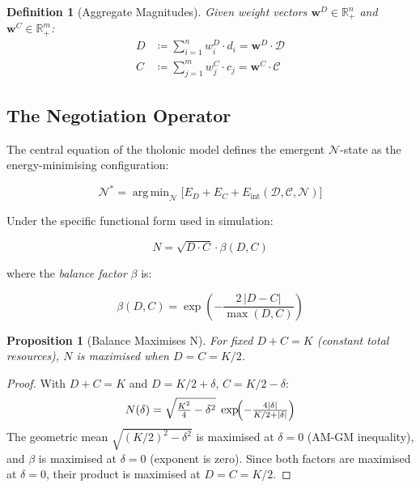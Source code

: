 \documentclass[12pt,a4paper,twocolumn]{article}
\newtheorem{proposition}[theorem]{Proposition}
\newtheorem{definition}{Definition}[section]
\newcommand{\N}{\mathcal{N}}
\newcommand{\D}{\mathcal{D}}
\newcommand{\CC}{\mathcal{C}}
\newcommand{\R}{\mathbb{R}}
\newcommand{\argmin}{\operatorname{arg\,min}}
\begin{document}
\begin{definition}[Aggregate Magnitudes]
\label{def:aggregates}
Given weight vectors $\mathbf{w}^D \in \R^n_+$ and $\mathbf{w}^C \in \R^m_+$:
\begin{align}
D &\coloneqq \sum_{i=1}^n w_i^D \cdot d_i = \mathbf{w}^D \cdot \D \\
C &\coloneqq \sum_{j=1}^m w_j^C \cdot c_j = \mathbf{w}^C \cdot \CC
\end{align}
\end{definition}

\subsection{The Negotiation Operator}

The central equation of the tholonic model defines the emergent $\N$-state as the energy-minimising configuration:

\begin{equation}
\label{eq:nstate}
\N^* = \argmin_{\N} \bigl[ E_D + E_C + E_{\mathrm{int}}(\D, \CC, \N) \bigr]
\end{equation}

Under the specific functional form used in simulation:

\begin{equation}
\label{eq:nvalue}
N = \sqrt{D \cdot C} \cdot \beta(D, C)
\end{equation}

where the \emph{balance factor} $\beta$ is:

\begin{equation}
\label{eq:balance}
\beta(D, C) = \exp\!\left(-\frac{2\,|D - C|}{\max(D, C)}\right)
\end{equation}

\begin{proposition}[Balance Maximises N]
\label{prop:balance}
For fixed $D + C = K$ (constant total resources), $N$ is maximised when $D = C = K/2$.
\end{proposition}

\begin{proof}
With $D + C = K$ and $D = K/2 + \delta$, $C = K/2 - \delta$:
\[
N(\delta) = \sqrt{\tfrac{K^2}{4} - \delta^2}\; \exp\!\Bigl({-}\tfrac{4|\delta|}{K/2 + |\delta|}\Bigr)
\]
The geometric mean $\sqrt{(K/2)^2 - \delta^2}$ is maximised at $\delta = 0$ (AM-GM inequality), and $\beta$ is maximised at $\delta = 0$ (exponent is zero).
Since both factors are maximised at $\delta = 0$, their product is maximised at $D = C = K/2$.
\end{proof}
\end{document}
